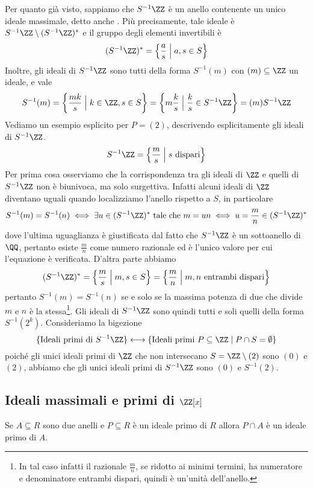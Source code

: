 \documentclass[11pt]{scrartcl}
\begin{document}
	Per quanto già visto, sappiamo che $S^{-1}\ZZ$ è un anello contenente
	un unico ideale massimale, detto anche . Più precisamente,
	tale ideale è $S^{-1}\ZZ \setminus (S^{-1}\ZZ)^*$ e il gruppo degli elementi
	invertibili è
	\[
	(S^{-1}\ZZ)^* = \left\{\frac a s \Bigm| a, s \in S\right\}
	\] 
	Inoltre, gli ideali di $S^{-1}\ZZ$
	sono tutti della forma $S^{-1}(m)$ con $(m)\subseteq \ZZ$ un ideale, e vale 
	\[
	S^{-1}(m) = \left\{\frac{mk}{s} \Bigm|k \in \ZZ, s \in S\right\} = 
	\left\{m\frac k s\Bigm| \frac k s \in S^{-1}\ZZ\right\} = (m)S^{-1}\ZZ
	\]
	Vediamo un esempio esplicito per $P = (2)$, descrivendo esplicitamente gli 
	ideali di $S^{-1}\ZZ$. 
	\[
	S^{-1}\ZZ = \left\{\frac m s \Bigm| s \text{ dispari}\right\}
	\]
	Per prima cosa osserviamo che la corrispondenza tra 
	gli ideali di $\ZZ$ e quelli di $S^{-1}\ZZ$ non è biunivoca, ma solo surgettiva.
	Infatti alcuni ideali di $\ZZ$ diventano uguali quando localizziamo l'anello
	rispetto a $S$, in particolare
	\[
	S^{-1}(m) = S^{-1}(n) \iff \exists u \in (S^{-1}\ZZ)^* \text{ tale che }
	m = un \iff u = \frac m n \in (S^{-1}\ZZ)^*
	\]
	dove l'ultima uguaglianza è giustificata dal fatto che $S^{-1}\ZZ$ è un 
	sottoanello di $\QQ$, pertanto esiste $\displaystyle\frac m n$ come numero
	razionale ed è l'unico valore per cui l'equazione è verificata. D'altra parte
	abbiamo 
	\[
	(S^{-1}\ZZ)^* = \left\{\frac m s \Bigm| m, s \in S\right\} = 
	\left\{\frac m n \Bigm| m, n\text{ entrambi dispari}\right\}
	\]
	pertanto $S^{-1}(m) = S^{-1}(n)$ se e solo se la massima potenza di due che 
	divide $m$ e $n$ è la stessa\footnote{
		In tal caso infatti il razionale $\frac m n$, se ridotto ai 
		minimi termini, ha numeratore e denominatore entrambi dispari, quindi
		è un'unità dell'anello.
	}.
	Gli ideali di $S^{-1}\ZZ$ sono quindi tutti e soli quelli della forma $S^{-1}(2^k)$.
	Consideriamo la bigezione
	\[
	\{\text{Ideali primi di }S^{-1}\ZZ\}\longleftrightarrow 
	\{\text{Ideali primi } P\subseteq \ZZ \mid P\cap S = \emptyset\}
	\]
	poiché gli unici ideali primi di $\ZZ$ che non intersecano $S = \ZZ\setminus(2)$
	sono $(0)$ e $(2)$, abbiamo che gli unici ideali primi di $S^{-1}\ZZ$ sono
	$(0)$ e $S^{-1}(2)$.
	
	\newpage
	
	\subsection{Ideali massimali e primi di $\ZZ[x]$}
	
	\begin{lemma}
		\label{lemma2.3}
		Se $A \subseteq R$ sono due anelli e $P \subseteq R$ è un ideale primo
		di $R$ allora $P\cap A$ è un ideale primo di $A$.
	\end{lemma}
	
\end{document}

